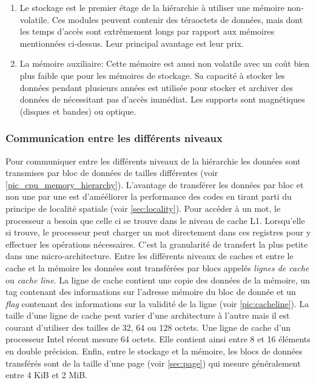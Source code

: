 \begin{enumerate}
    \item Le stockage est le premier étage de la hiérarchie à utiliser une mémoire non-volatile. Ces modules peuvent contenir des téraoctets de données, mais dont les temps d'accès sont extrêmement longs par rapport aux mémoires mentionnées ci-dessus. Leur principal avantage est leur prix.
    
    \item La mémoire auxiliaire: Cette mémoire est aussi non volatile avec un coût bien plus faible que pour les mémoires de stockage. Sa capacité à stocker les données pendant plusieurs années est utilisée pour stocker et archiver des données de nécessitant pas d'accès immédiat. Les supports sont magnétiques (disques et bandes) ou optique.

\end{enumerate}

\subsubsection{Communication entre les différents niveaux}
Pour communiquer entre les différents niveaux de la hiérarchie les données sont transmises par bloc de données de tailles différentes (voir \autoref{pic_cpu_memory_hierarchy}). L'avantage de transférer les données par bloc et non une par une est d'amééliorer la performance des codes en tirant parti du principe de localité spatiale (voir \autoref{sec:locality}).
Pour accéder à un mot, le processeur a besoin que celle ci se trouve dans le niveau de cache L1. Lorsqu'elle si trouve, le processeur peut charger un mot directement dans ces registres pour y effectuer les opérations nécessaires. C'est la granularité de transfert la plus petite dans une micro-architecture. Entre les différents niveaux de caches et entre le cache et la mémoire les données sont transférées par blocs appelés \textit{lignes de cache} ou \textit{cache line}. La ligne de cache contient une copie des données de la mémoire, un tag contenant des informations sur l'adresse mémoire du bloc de donnée et un \textit{flag} contenant des informations sur la validité de la ligne (voir \autoref{pic:cacheline}). La taille d'une ligne de cache peut varier d'une architecture à l'autre mais il est courant d'utiliser des tailles de 32, 64 ou 128 octets. Une ligne de cache d'un processeur Intel récent mesure 64 octets. Elle contient ainsi entre 8 et 16 éléments en double précision. Enfin, entre le stockage et la mémoire, les blocs de données transférés sont de la taille d'une page (voir \autoref{sec:page}) qui mesure généralement entre 4 KiB et 2 MiB.

